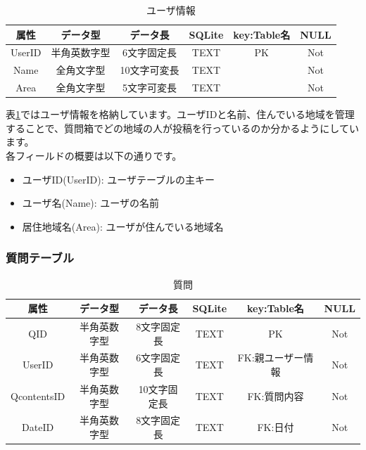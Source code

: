 \documentclass[a4j]{jarticle}
\begin{document}
\begin{table}[H]
    \caption{ユーザ情報}
    \label{tbl: user}
    \begin{center}
        \begin{tabular}{|c|c|c|c|c|c|} \hline
            属性 & データ型 & データ長 & SQLite & key:Table名 & NULL\\ \hline \hline
            UserID & 半角英数字型 & 6文字固定長 & TEXT & PK & Not\\ \hline
            Name & 全角文字型 & 10文字可変長 & TEXT & & Not\\ \hline
            Area & 全角文字型 & 5文字可変長 & TEXT & & Not\\ \hline
        \end{tabular}
    \end{center}
\end{table}

表\ref{tbl: user}ではユーザ情報を格納しています。ユーザIDと名前、住んでいる地域を管理することで、質問箱でどの地域の人が投稿を行っているのか分かるようにしています。\\
各フィールドの概要は以下の通りです。
\begin{itemize}
  \item ユーザID(UserID):
  ユーザテーブルの主キー
  \item ユーザ名(Name):
  ユーザの名前
  \item 居住地域名(Area):
  ユーザが住んでいる地域名
\end{itemize}

\subsubsection{質問テーブル}

\begin{table}[H]
    \caption{質問}
    \label{tbl: question}
    \begin{center}
        \begin{tabular}{|c|c|c|c|c|c|} \hline
            属性 & データ型 & データ長 & SQLite & key:Table名 & NULL\\ \hline \hline
            QID & 半角英数字型 & 8文字固定長 & TEXT & PK & Not\\ \hline
            UserID & 半角英数字型 & 6文字固定長 & TEXT & FK:親ユーザー情報 & Not\\ \hline
            QcontentsID & 半角英数字型 & 10文字固定長 & TEXT & FK:質問内容 & Not\\ \hline
            DateID & 半角英数字型 & 8文字固定長 & TEXT & FK:日付 & Not\\ \hline
        \end{tabular}
    \end{center}
\end{table}
\end{document}
